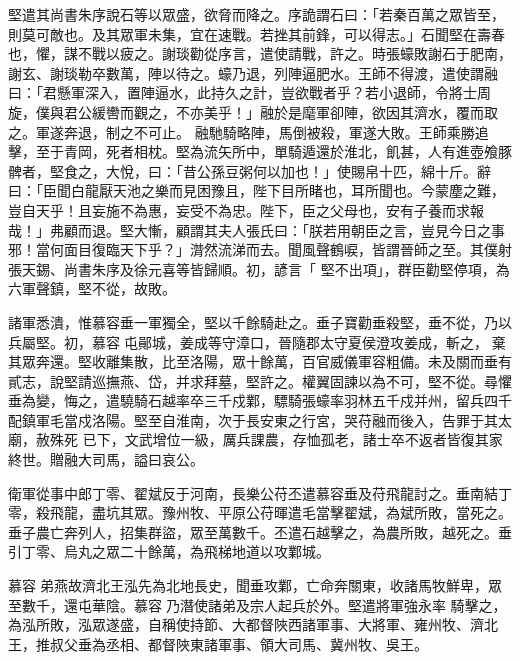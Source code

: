 \begin{pinyinscope}
 堅遣其尚書朱序說石等以眾盛，欲脅而降之。序詭謂石曰：「若秦百萬之眾皆至，則莫可敵也。及其眾軍未集，宜在速戰。若挫其前鋒，可以得志。」石聞堅在壽春也，懼，謀不戰以疲之。謝琰勸從序言，遣使請戰，許之。時張蠔敗謝石于肥南，謝玄、謝琰勒卒數萬，陣以待之。蠔乃退，列陣逼肥水。王師不得渡，遣使謂融曰：「君懸軍深入，置陣逼水，此持久之計，豈欲戰者乎？若小退師，令將士周旋，僕與君公緩轡而觀之，不亦美乎！」融於是麾軍卻陣，欲因其濟水，覆而取之。軍遂奔退，制之不可止。
 融馳騎略陣，馬倒被殺，軍遂大敗。王師乘勝追擊，至于青岡，死者相枕。堅為流矢所中，單騎遁還於淮北，飢甚，人有進壺飧豚髀者，堅食之，大悅，曰：「昔公孫豆粥何以加也！」使賜帛十匹，綿十斤。辭曰：「臣聞白龍厭天池之樂而見困豫且，陛下目所睹也，耳所聞也。今蒙塵之難，豈自天乎！且妄施不為惠，妄受不為忠。陛下，臣之父母也，安有子養而求報哉！」弗顧而退。堅大慚，顧謂其夫人張氏曰：「朕若用朝臣之言，豈見今日之事邪！當何面目復臨天下乎？」潸然流涕而去。聞風聲鶴唳，皆謂晉師之至。其僕射張天錫、尚書朱序及徐元喜等皆歸順。初，諺言「
 堅不出項」，群臣勸堅停項，為六軍聲鎮，堅不從，故敗。



 諸軍悉潰，惟慕容垂一軍獨全，堅以千餘騎赴之。垂子寶勸垂殺堅，垂不從，乃以兵屬堅。初，慕容屯鄖城，姜成等守漳口，晉隨郡太守夏侯澄攻姜成，斬之，棄其眾奔還。堅收離集散，比至洛陽，眾十餘萬，百官威儀軍容粗備。未及關而垂有貳志，說堅請巡撫燕、岱，并求拜墓，堅許之。權翼固諫以為不可，堅不從。尋懼垂為變，悔之，遣驍騎石越率卒三千戍鄴，驃騎張蠔率羽林五千戍并州，留兵四千配鎮軍毛當戍洛陽。堅至自淮南，次于長安東之行宮，哭苻融而後入，告罪于其太廟，赦殊死
 已下，文武增位一級，厲兵課農，存恤孤老，諸士卒不返者皆復其家終世。贈融大司馬，謚曰哀公。



 衛軍從事中郎丁零、翟斌反于河南，長樂公苻丕遣慕容垂及苻飛龍討之。垂南結丁零，殺飛龍，盡坑其眾。豫州牧、平原公苻暉遣毛當擊翟斌，為斌所敗，當死之。垂子農亡奔列人，招集群盜，眾至萬數千。丕遣石越擊之，為農所敗，越死之。垂引丁零、烏丸之眾二十餘萬，為飛梯地道以攻鄴城。



 慕容弟燕故濟北王泓先為北地長史，聞垂攻鄴，亡命奔關東，收諸馬牧鮮卑，眾至數千，還屯華陰。慕容乃潛使諸弟及宗人起兵於外。堅遣將軍強永率
 騎擊之，為泓所敗，泓眾遂盛，自稱使持節、大都督陜西諸軍事、大將軍、雍州牧、濟北王，推叔父垂為丞相、都督陜東諸軍事、領大司馬、冀州牧、吳王。




\end{pinyinscope}
